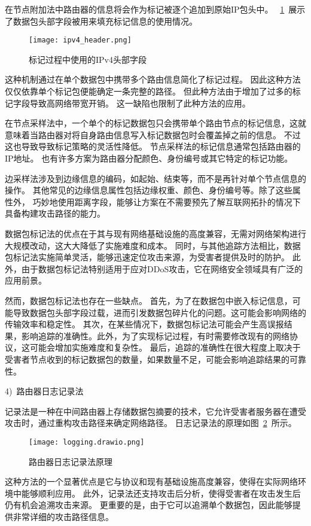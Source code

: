 在节点附加法中路由器的信息将会作为标记被逐个追加到原始IP包头中\cite{Amin2006,Min2003}。
~\ref{fig:ipv4_header}~展示了数据包头部字段被用来填充标记信息的使用情况。
\begin{figure}[h]
  \centering
  \texttt{[image: ipv4\_header.png]}
  \caption{标记过程中使用的IPv4头部字段}
  \label{fig:ipv4_header}
\end{figure}
这种机制通过在单个数据包中携带多个路由信息简化了标记过程。
因此这种方法仅仅依靠单个标记包便能确定一条完整的路径。
但此种方法由于增加了过多的标记字段导致高网络带宽开销。
这一缺陷也限制了此种方法的应用。\par

在节点采样法中，一个单个的标记数据包只会携带单个路由节点的标记信息，这就意味着当路由器对将自身路由信息写入标记数据包时会覆盖掉之前的信息。
不过这也导致导致标记策略的灵活性降低。
节点采样法的标记信息通常包括路由器的IP地址。
也有许多方案为路由器分配颜色、身份编号或其它特定的标记功能\cite{Jin2009,Liu2006}。\par

边采样法涉及到边缘信息的编码，如起始、结束等，而不是再针对单个节点信息的操作。
其他常见的边缘信息属性包括边缘权重、颜色、身份编号等。除了这些属性外，
巧妙地使用距离字段，能够让方案在不需要预先了解互联网拓扑的情况下具备构建攻击路径的能力。\par

数据包标记法的优点在于其与现有网络基础设施的高度兼容，无需对网络架构进行大规模改动，这大大降低了实施难度和成本。
同时，与其他追踪方法相比，数据包标记法实施简单灵活，能够迅速定位攻击来源，为受害者提供及时的防护。
此外，由于数据包标记法特别适用于应对DDoS攻击，它在网络安全领域具有广泛的应用前景。\par

然而，数据包标记法也存在一些缺点。
首先，为了在数据包中嵌入标记信息，可能导致数据包头部字段过载，进而引发数据包碎片化的问题。这可能会影响网络的传输效率和稳定性。
其次，在某些情况下，数据包标记法可能会产生高误报结果，影响追踪的准确性。此外，为了实现标记过程，有时需要修改现有的网络协议，这可能会增加实施难度和复杂性。
最后，追踪的准确性在很大程度上取决于受害者节点收到的标记数据包的数量，如果数量不足，可能会影响追踪结果的可靠性。


4)~路由器日志记录法\par
记录法是一种在中间路由器上存储数据包摘要的技术，它允许受害者服务器在遭受攻击时，通过重构攻击路径来确定网络路径。
日志记录法的原理如图~\ref{fig:loggging}~所示。
\begin{figure}[htbp]
  \centering
  \texttt{[image: logging.drawio.png]}
  \caption{路由器日志记录法原理}
  \label{fig:loggging}
\end{figure}
这种方法的一个显著优点是它与协议和现有基础设施高度兼容，使得在实际网络环境中能够顺利应用。
此外，记录法还支持攻击后分析，使得受害者在攻击发生后仍有机会追溯攻击来源。
更重要的是，由于它可以追溯单个数据包，因此能够提供非常详细的攻击路径信息。\par

